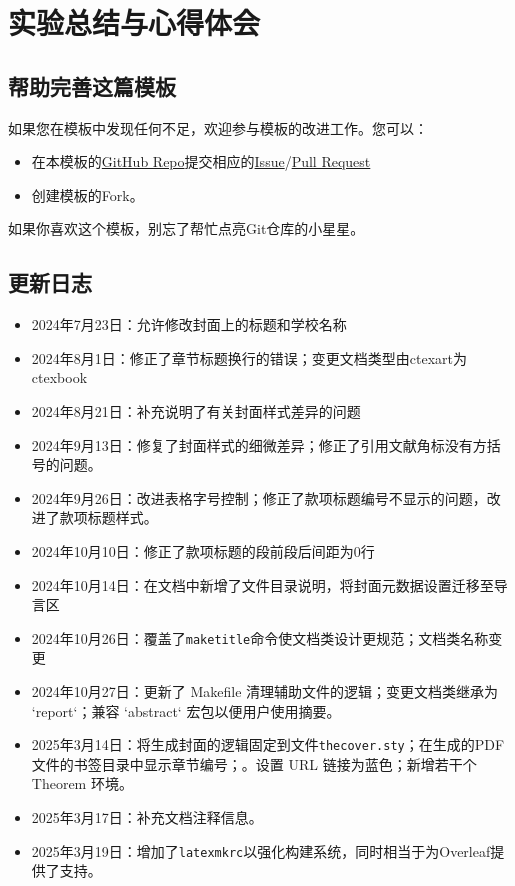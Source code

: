 \chapter{实验总结与心得体会}

\section{帮助完善这篇模板}\label{sec:joinus}

如果您在模板中发现任何不足，欢迎参与模板的改进工作。您可以：

\begin{itemize}
    \item 在本模板的\href{https://github.com/GitHubonline1396529/dlmuucexpreport}{GitHub Repo}提交相应的\href{https://github.com/GitHubonline1396529/dlmuucexpreport/issues}{Issue}/\href{https://github.com/GitHubonline1396529/dlmuucexpreport/pulls}{Pull Request}
    \item 创建模板的Fork。
\end{itemize}

如果你喜欢这个模板，别忘了帮忙点亮Git仓库的小星星。

\section{更新日志}

\begin{itemize}
    \item 2024年7月23日：允许修改封面上的标题和学校名称
    \item 2024年8月1日：修正了章节标题换行的错误；变更文档类型由ctexart为ctexbook
    \item 2024年8月21日：补充说明了有关封面样式差异的问题
    \item 2024年9月13日：修复了封面样式的细微差异；修正了引用文献角标没有方括号的问题。
    \item 2024年9月26日：改进表格字号控制；修正了款项标题编号不显示的问题，改进了款项标题样式。
    \item 2024年10月10日：修正了款项标题的段前段后间距为0行
    \item 2024年10月14日：在文档中新增了文件目录说明，将封面元数据设置迁移至导言区
    \item 2024年10月26日：覆盖了\texttt{maketitle}命令使文档类设计更规范；文档类名称变更
    \item 2024年10月27日：更新了 Makefile 清理辅助文件的逻辑；变更文档类继承为 `report`；兼容 `abstract` 宏包以便用户使用摘要。
    \item 2025年3月14日：将生成封面的逻辑固定到文件\texttt{thecover.sty}；在生成的PDF文件的书签目录中显示章节编号；。设置 URL 链接为蓝色；新增若干个 Theorem 环境。
    \item 2025年3月17日：补充文档注释信息。
    \item 2025年3月19日：增加了\texttt{latexmkrc}以强化构建系统，同时相当于为Overleaf提供了支持。
\end{itemize}
